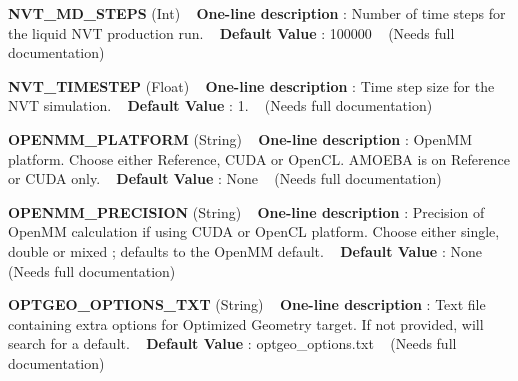 \begin{DoxyItemize}
\item {\bfseries  N\+V\+T\+\_\+\+M\+D\+\_\+\+S\+T\+E\+PS } (Int) ~\newline
{\bfseries  One-\/line description }\+: Number of time steps for the liquid N\+VT production run. ~\newline
{\bfseries  Default Value }\+: 100000 ~\newline
(Needs full documentation)\end{DoxyItemize}
\begin{DoxyItemize}
\item {\bfseries  N\+V\+T\+\_\+\+T\+I\+M\+E\+S\+T\+EP } (Float) ~\newline
{\bfseries  One-\/line description }\+: Time step size for the N\+VT simulation. ~\newline
{\bfseries  Default Value }\+: 1. ~\newline
(Needs full documentation)\end{DoxyItemize}
\begin{DoxyItemize}
\item {\bfseries  O\+P\+E\+N\+M\+M\+\_\+\+P\+L\+A\+T\+F\+O\+RM } (String) ~\newline
{\bfseries  One-\/line description }\+: Open\+MM platform. Choose either Reference, C\+U\+DA or Open\+CL. A\+M\+O\+E\+BA is on Reference or C\+U\+DA only. ~\newline
{\bfseries  Default Value }\+: None ~\newline
(Needs full documentation)\end{DoxyItemize}
\begin{DoxyItemize}
\item {\bfseries  O\+P\+E\+N\+M\+M\+\_\+\+P\+R\+E\+C\+I\+S\+I\+ON } (String) ~\newline
{\bfseries  One-\/line description }\+: Precision of Open\+MM calculation if using C\+U\+DA or Open\+CL platform. Choose either single, double or mixed ; defaults to the Open\+MM default. ~\newline
{\bfseries  Default Value }\+: None ~\newline
(Needs full documentation)\end{DoxyItemize}
\begin{DoxyItemize}
\item {\bfseries  O\+P\+T\+G\+E\+O\+\_\+\+O\+P\+T\+I\+O\+N\+S\+\_\+\+T\+XT } (String) ~\newline
{\bfseries  One-\/line description }\+: Text file containing extra options for Optimized Geometry target. If not provided, will search for a default. ~\newline
{\bfseries  Default Value }\+: optgeo\+\_\+options.\+txt ~\newline
(Needs full documentation)\end{DoxyItemize}
